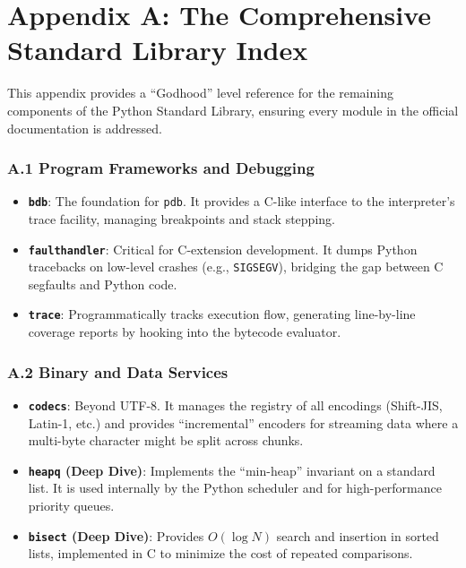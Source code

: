 \hypertarget{appendix-a-the-comprehensive-standard-library-index}{%
\chapter{Appendix A: The Comprehensive Standard Library
Index}\label{appendix-a-the-comprehensive-standard-library-index}}

This appendix provides a ``Godhood'' level reference for the remaining
components of the Python Standard Library, ensuring every module in the
official documentation is addressed.

\hypertarget{a.1-program-frameworks-and-debugging}{%
\subsection{A.1 Program Frameworks and
Debugging}\label{a.1-program-frameworks-and-debugging}}

\begin{itemize}
\tightlist
\item
  \textbf{\passthrough{\lstinline!bdb!}}: The foundation for
  \passthrough{\lstinline!pdb!}. It provides a C-like interface to the
  interpreter's trace facility, managing breakpoints and stack stepping.
\item
  \textbf{\passthrough{\lstinline!faulthandler!}}: Critical for
  C-extension development. It dumps Python tracebacks on low-level
  crashes (e.g., \passthrough{\lstinline!SIGSEGV!}), bridging the gap
  between C segfaults and Python code.
\item
  \textbf{\passthrough{\lstinline!trace!}}: Programmatically tracks
  execution flow, generating line-by-line coverage reports by hooking
  into the bytecode evaluator.
\end{itemize}

\hypertarget{a.2-binary-and-data-services}{%
\subsection{A.2 Binary and Data
Services}\label{a.2-binary-and-data-services}}

\begin{itemize}
\tightlist
\item
  \textbf{\passthrough{\lstinline!codecs!}}: Beyond UTF-8. It manages
  the registry of all encodings (Shift-JIS, Latin-1, etc.) and provides
  ``incremental'' encoders for streaming data where a multi-byte
  character might be split across chunks.
\item
  \textbf{\passthrough{\lstinline!heapq!} (Deep Dive)}: Implements the
  ``min-heap'' invariant on a standard list. It is used internally by
  the Python scheduler and for high-performance priority queues.
\item
  \textbf{\passthrough{\lstinline!bisect!} (Deep Dive)}: Provides
  \(O(\log N)\) search and insertion in sorted lists, implemented in C
  to minimize the cost of repeated comparisons.
\end{itemize}

